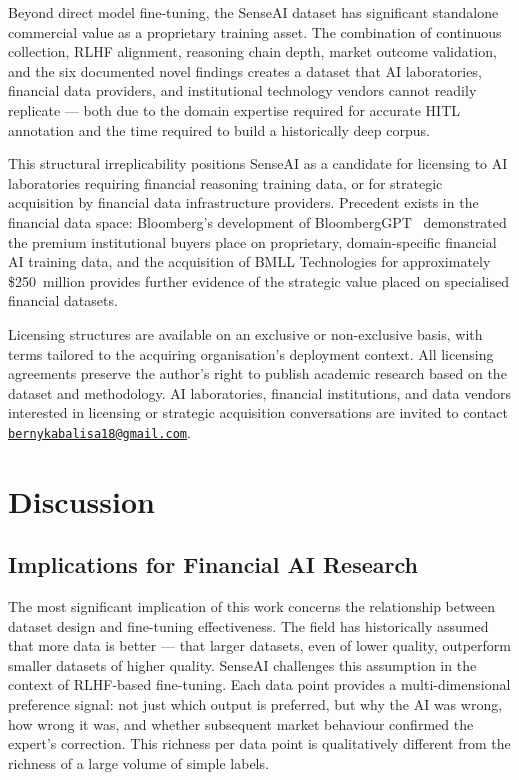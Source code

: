 \documentclass[11pt,a4paper]{article}
\begin{document}
Beyond direct model fine-tuning, the SenseAI dataset has significant standalone
commercial value as a proprietary training asset. The combination of continuous
collection, RLHF alignment, reasoning chain depth, market outcome validation, and
the six documented novel findings creates a dataset that AI laboratories, financial
data providers, and institutional technology vendors cannot readily replicate --- both
due to the domain expertise required for accurate HITL annotation and the time
required to build a historically deep corpus.

This structural irreplicability positions SenseAI as a candidate for licensing to AI
laboratories requiring financial reasoning training data, or for strategic acquisition
by financial data infrastructure providers. Precedent exists in the financial data
space: Bloomberg's development of BloombergGPT~\cite{wu2023bloomberggpt}
demonstrated the premium institutional buyers place on proprietary, domain-specific
financial AI training data, and the acquisition of BMLL Technologies for approximately
\$250~million provides further evidence of the strategic value placed on specialised
financial datasets.

Licensing structures are available on an exclusive or non-exclusive basis, with terms
tailored to the acquiring organisation's deployment context. All licensing agreements
preserve the author's right to publish academic research based on the dataset and
methodology. AI laboratories, financial institutions, and data vendors interested in
licensing or strategic acquisition conversations are invited to contact
\href{mailto:bernykabalisa18@gmail.com}{\texttt{bernykabalisa18@gmail.com}}.

\section{Discussion}
\label{sec:discussion}

\subsection{Implications for Financial AI Research}

The most significant implication of this work concerns the relationship between
dataset design and fine-tuning effectiveness. The field has historically assumed that
more data is better --- that larger datasets, even of lower quality, outperform smaller
datasets of higher quality. SenseAI challenges this assumption in the context of
RLHF-based fine-tuning. Each data point provides a multi-dimensional preference
signal: not just which output is preferred, but why the AI was wrong, how wrong it
was, and whether subsequent market behaviour confirmed the expert's correction.
This richness per data point is qualitatively different from the richness of a large
volume of simple labels.
\end{document}

